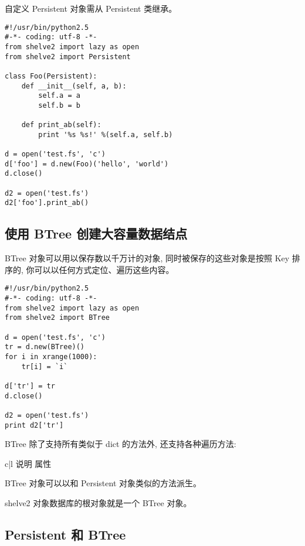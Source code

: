 \documentclass{manual}
\begin{document}
自定义 Persistent 对象需从 Persistent 类继承。

\begin{verbatim}
#!/usr/bin/python2.5
#-*- coding: utf-8 -*-
from shelve2 import lazy as open
from shelve2 import Persistent

class Foo(Persistent):
	def __init__(self, a, b):
		self.a = a
		self.b = b

	def print_ab(self):
		print '%s %s!' %(self.a, self.b)

d = open('test.fs', 'c')
d['foo'] = d.new(Foo)('hello', 'world')
d.close()

d2 = open('test.fs')
d2['foo'].print_ab()
\end{verbatim}

\subsection{使用 BTree 创建大容量数据结点}

BTree 对象可以用以保存数以千万计的对象, 同时被保存的这些对象是按照 Key 排序的, 你可以以任何方式定位、遍历这些内容。

\begin{verbatim}
#!/usr/bin/python2.5
#-*- coding: utf-8 -*-
from shelve2 import lazy as open
from shelve2 import BTree

d = open('test.fs', 'c')
tr = d.new(BTree)()
for i in xrange(1000):
	tr[i] = `i`

d['tr'] = tr
d.close()

d2 = open('test.fs')
print d2['tr']
\end{verbatim}

BTree 除了支持所有类似于 dict 的方法外, 还支持各种遍历方法:

\begin{tableii}{c|l}{}{ 说明 }{ 属性 }
\end{tableii}

BTree 对象可以以和 Persistent 对象类似的方法派生。

shelve2 对象数据库的根对象就是一个 BTree 对象。 

\subsection{Persistent 和 BTree}
\end{document}
